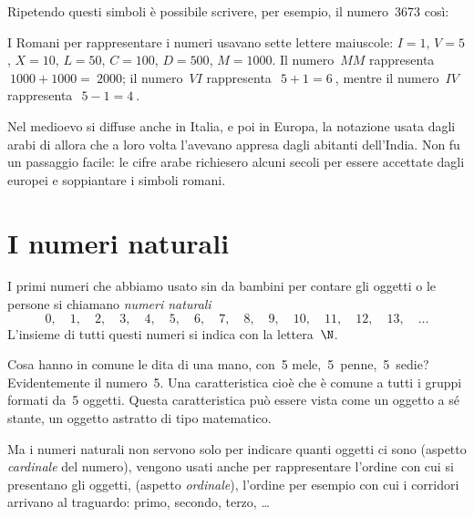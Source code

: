 Ripetendo questi simboli è possibile scrivere, per esempio, il numero~3673 
così:

\begin{inaccessibleblock}
\vspace{-2ex}
\begin{center} 
\end{center}
\vspace{-2ex}
\end{inaccessibleblock}

I Romani per rappresentare i numeri usavano sette lettere maiuscole: 
\(I=1\), \(V=5\), \(X=10\), \(L=50\), \(C=100\), \(D=500\), 
\(M=1000\).
Il numero~\(MM\) rappresenta~\(~1000+1000 =~2000\); il numero~\( VI\) 
rappresenta~\(~5+1=6~\), mentre il numero~\( IV~\) rappresenta~\(~5-1=4~\).

Nel medioevo si diffuse anche in Italia, e poi in Europa, la notazione usata
dagli arabi di allora che a loro volta l'avevano appresa dagli abitanti 
dell'India. 
Non fu un passaggio facile: le cifre arabe richiesero alcuni secoli per 
essere accettate dagli europei e 
soppiantare i simboli romani.

\section{I numeri naturali}
\label{sec:nat_naturali}

I primi numeri che abbiamo usato sin da bambini per contare gli oggetti o 
le persone si chiamano \emph{numeri naturali}
\[0,\quad 1,\quad 2,\quad 3,\quad 4,\quad 5,\quad 6,\quad 7,\quad 8,\quad 
  9,\quad 10,\quad 11,\quad 12,\quad 13,\quad \dots\]
L'insieme di tutti questi numeri si indica con la lettera~\(\N\).

Cosa hanno in comune le dita di una mano, con~5 mele,~5~penne,~5~sedie? 
Evidentemente il numero~5. Una caratteristica cioè che è comune a tutti i 
gruppi formati da~5 oggetti. 
Questa caratteristica può essere vista come un oggetto a sé stante, 
un oggetto astratto di tipo matematico.

Ma i numeri naturali non servono solo per indicare quanti oggetti ci sono 
(aspetto \emph{cardinale} del numero), vengono usati anche per 
rappresentare 
l'ordine con cui si presentano gli oggetti, (aspetto \emph{ordinale}), 
l'ordine per esempio con cui i corridori arrivano al traguardo: primo, 
secondo, terzo, \ldots

